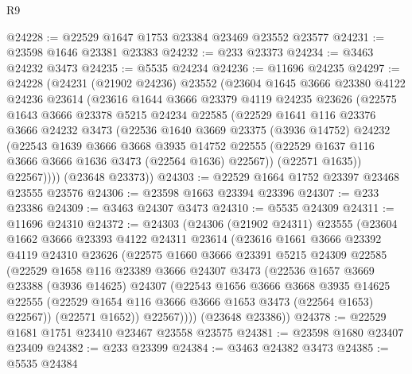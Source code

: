 \begin{lexlean}{R9}
\begin{coremodule}
@24228 := @22529 @1647 @1753 @23384 @23469 @23552 @23577
@24231 := @23598 @1646 @23381 @23383
@24232 := @233 @23373
@24234 := @3463 @24232 @3473
@24235 := @5535 @24234
@24236 := @11696 @24235
@24297 := @24228
    (@24231
      (@21902 @24236)
      @23552
      (@23604
        @1645
        @3666
        @23380
        @4122
        @24236
        @23614
        (@23616
          @1644
          @3666
          @23379
          @4119
          @24235
          @23626
          (@22575
            @1643
            @3666
            @23378
            @5215
            @24234
            @22585
            (@22529
              @1641
              @116
              @23376
              @3666
              @24232
              @3473
              (@22536
                @1640
                @3669
                @23375
                (@3936 @14752)
                @24232
                (@22543
                  @1639
                  @3666
                  @3668
                  @3935
                  @14752
                  @22555
                  (@22529 @1637 @116 @3666 @3666 @1636 @3473 (@22564 @1636) @22567))
                (@22571 @1635))
              @22567))))
      (@23648 @23373))
@24303 := @22529 @1664 @1752 @23397 @23468 @23555 @23576
@24306 := @23598 @1663 @23394 @23396
@24307 := @233 @23386
@24309 := @3463 @24307 @3473
@24310 := @5535 @24309
@24311 := @11696 @24310
@24372 := @24303
    (@24306
      (@21902 @24311)
      @23555
      (@23604
        @1662
        @3666
        @23393
        @4122
        @24311
        @23614
        (@23616
          @1661
          @3666
          @23392
          @4119
          @24310
          @23626
          (@22575
            @1660
            @3666
            @23391
            @5215
            @24309
            @22585
            (@22529
              @1658
              @116
              @23389
              @3666
              @24307
              @3473
              (@22536
                @1657
                @3669
                @23388
                (@3936 @14625)
                @24307
                (@22543
                  @1656
                  @3666
                  @3668
                  @3935
                  @14625
                  @22555
                  (@22529 @1654 @116 @3666 @3666 @1653 @3473 (@22564 @1653) @22567))
                (@22571 @1652))
              @22567))))
      (@23648 @23386))
@24378 := @22529 @1681 @1751 @23410 @23467 @23558 @23575
@24381 := @23598 @1680 @23407 @23409
@24382 := @233 @23399
@24384 := @3463 @24382 @3473
@24385 := @5535 @24384

\end{coremodule}
\end{lexlean}
